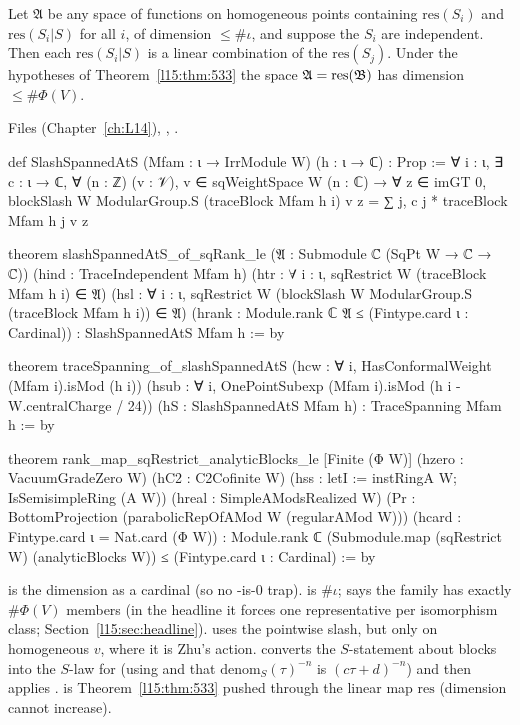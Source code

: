 \begin{theorem}\label{l15:thm:rank}
Let $\mathfrak A$ be any space of functions on homogeneous points containing $\mathrm{res}(S_i)$ and $\mathrm{res}(S_i|S)$ for all $i$,
of dimension $\le\#\iota$, and suppose the $S_i$ are independent. Then each $\mathrm{res}(S_i|S)$ is a linear combination of the
$\mathrm{res}(S_j)$. Under the hypotheses of Theorem~\ref{l15:thm:533} the space $\mathfrak A=\mathrm{res}(\mathfrak{B})$ has dimension
$\le\#\Phi(V)$.
\end{theorem}
\noindent Files  (Chapter~\ref{ch:L14}),
, .
\begin{leancode}
def SlashSpannedAtS (Mfam : ι → IrrModule W) (h : ι → ℂ) : Prop :=
  ∀ i : ι, ∃ c : ι → ℂ, ∀ (n : ℤ) (v : 𝒱), v ∈ sqWeightSpace W (n : ℂ) → ∀ z ∈ imGT 0,
    blockSlash W ModularGroup.S (traceBlock Mfam h i) v z
      = ∑ j, c j * traceBlock Mfam h j v z

theorem slashSpannedAtS_of_sqRank_le (𝔄 : Submodule ℂ (SqPt W → ℂ → ℂ))
    (hind : TraceIndependent Mfam h)
    (htr : ∀ i : ι, sqRestrict W (traceBlock Mfam h i) ∈ 𝔄)
    (hsl : ∀ i : ι, sqRestrict W (blockSlash W ModularGroup.S (traceBlock Mfam h i)) ∈ 𝔄)
    (hrank : Module.rank ℂ 𝔄 ≤ (Fintype.card ι : Cardinal)) :
    SlashSpannedAtS Mfam h := by

theorem traceSpanning_of_slashSpannedAtS (hcw : ∀ i, HasConformalWeight (Mfam i).isMod (h i))
    (hsub : ∀ i, OnePointSubexp (Mfam i).isMod (h i - W.centralCharge / 24))
    (hS : SlashSpannedAtS Mfam h) : TraceSpanning Mfam h := by

theorem rank_map_sqRestrict_analyticBlocks_le [Finite (Φ W)]
    (hzero : VacuumGradeZero W) (hC2 : C2Cofinite W)
    (hss : letI := instRingA W; IsSemisimpleRing (A W))
    (hreal : SimpleAModsRealized W)
    (Pr : BottomProjection (parabolicRepOfAMod W (regularAMod W)))
    (hcard : Fintype.card ι = Nat.card (Φ W)) :
    Module.rank ℂ (Submodule.map (sqRestrict W) (analyticBlocks W))
      ≤ (Fintype.card ι : Cardinal) := by
\end{leancode}

\begin{dictionary}
 is the dimension as a cardinal (so no -is-$0$ trap).  is $\#\iota$;
 says the family has exactly $\#\Phi(V)$ members (in the headline it forces one representative per
isomorphism class; Section~\ref{l15:sec:headline}).  uses the pointwise slash, but only on homogeneous $v$,
where it is Zhu's action. \allowbreak{} converts the $S$-statement about blocks into the
$S$-law for  (using  and that $\mathrm{denom}_S(\tau)^{-n}$ is $(c\tau+d)^{-n}$) and then applies
. \allowbreak{}\allowbreak{} is Theorem~\ref{l15:thm:533} pushed through the linear
map $\mathrm{res}$ (dimension cannot increase).
\end{dictionary}

